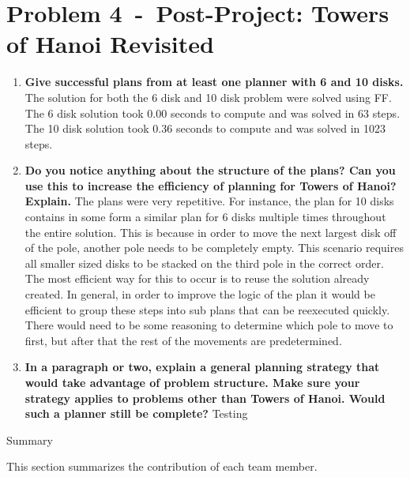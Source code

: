 \documentclass[12pt]{article}
\newcommand{\problem}[2]{\section*{Problem {#1}~-~{#2}}}
\begin{document}
\problem{4}{Post-Project: Towers of Hanoi Revisited}
\label{sec:problem_4}
\begin{enumerate}
 \item \textbf{Give successful plans from at least one planner with 6 and 10 disks.} \newline The solution for both the 6 disk and 10 disk problem were solved using FF. The 6 disk solution took 0.00 seconds to compute and was solved in 63 steps. The 10 disk solution took 0.36 seconds to compute and was solved in 1023 steps.
 \item \textbf{Do you notice anything about the structure of the plans? Can you use this to increase the
efficiency of planning for Towers of Hanoi? Explain.} \newline
   The plans were very repetitive. For instance, the plan for 10 disks contains in some form a similar plan for 6 disks multiple times throughout the entire solution. This is because in order to move the next largest disk off of the pole, another pole needs to be completely empty. This scenario requires all smaller sized disks to be stacked on the third pole in the correct order. The most efficient way for this to occur is to reuse the solution already created. In general, in order to improve the logic of the plan it would be efficient to group these steps into sub plans that can be reexecuted quickly. There would need to be some reasoning to determine which pole to move to first, but after that the rest of the movements are predetermined. 
 \item \textbf{In a paragraph or two, explain a general planning strategy that would take advantage of
problem structure. Make sure your strategy applies to problems other than Towers of Hanoi.
Would such a planner still be complete?}
\newline Testing
\end{enumerate}

\newpage
\begin{center}
\Huge{Summary} 
\end{center}
This section summarizes the contribution of each team member. 
\end{document}
